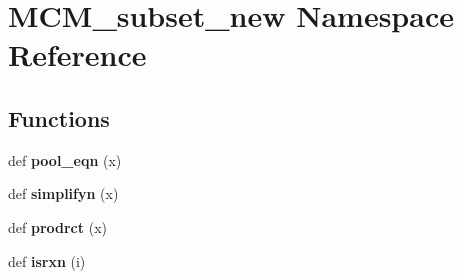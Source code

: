 \hypertarget{namespaceMCM__subset__new}{}\section{M\+C\+M\+\_\+subset\+\_\+new Namespace Reference}
\label{namespaceMCM__subset__new}
\subsection*{Functions}
\begin{DoxyCompactItemize}
\item 
\mbox{\label{namespaceMCM__subset__new_aa58f3d78500cff2fd739d89166c55972}} 
def {\bfseries pool\+\_\+eqn} (x)
\item 
\mbox{\label{namespaceMCM__subset__new_a49d072e4cd56c3b4f93bba32b1e9f45a}} 
def {\bfseries simplifyn} (x)
\item 
\mbox{\label{namespaceMCM__subset__new_af8cf315e44129588074c622870f75b77}} 
def {\bfseries prodrct} (x)
\item 
\mbox{\label{namespaceMCM__subset__new_a4ce2eb052d0ab4a64cd730a3dfacd92d}} 
def {\bfseries isrxn} (i)
\end{DoxyCompactItemize}
